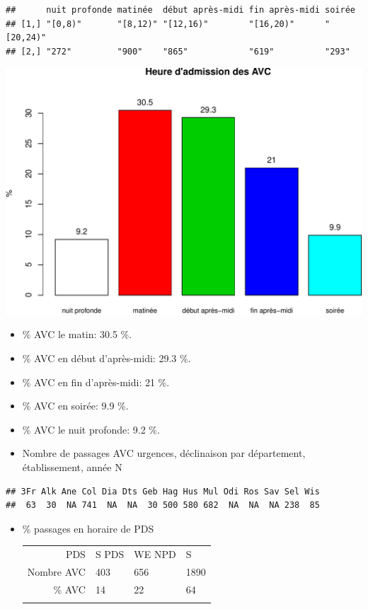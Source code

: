 \documentclass[]{article}
\begin{document}
\begin{verbatim}
##      nuit profonde matinée  début après-midi fin après-midi soirée   
## [1,] "[0,8)"       "[8,12)" "[12,16)"        "[16,20)"      "[20,24)"
## [2,] "272"         "900"    "865"            "619"          "293"
\end{verbatim}

\includegraphics{rapport2014_V4_files/figure-latex/avc_periode-1.pdf}

\begin{itemize}
\item
  \% AVC le matin: 30.5 \%.
\item
  \% AVC en début d'après-midi: 29.3 \%.
\item
  \% AVC en fin d'après-midi: 21 \%.
\item
  \% AVC en soirée: 9.9 \%.
\item
  \% AVC le nuit profonde: 9.2 \%.
\item
  Nombre de passages AVC urgences, déclinaison par département,
  établissement, année N
\end{itemize}

\begin{verbatim}
## 3Fr Alk Ane Col Dia Dts Geb Hag Hus Mul Odi Ros Sav Sel Wis 
##  63  30  NA 741  NA  NA  30 500 580 682  NA  NA  NA 238  85
\end{verbatim}

\begin{itemize}
\item
  \% passages en horaire de PDS

  \begin{longtable}[c]{@{}rlll@{}}
  \toprule\addlinespace
  PDS & S PDS & WE NPD & S
  \\\addlinespace
  \midrule\endhead
  Nombre AVC & 403 & 656 & 1890
  \\\addlinespace
  \% AVC & 14 & 22 & 64
  \\\addlinespace
  \bottomrule
  \end{longtable}
\end{itemize}
\end{document}
